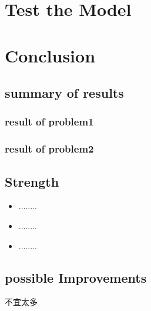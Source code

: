 \section{Test the Model}


\section{Conclusion}

\subsection{summary of results}

\subsubsection{result of problem1}

\subsubsection{result of problem2}


\subsection{Strength}
\begin{itemize}
	\item ........
	\item ........
	\item ........
\end{itemize}
\subsection{possible Improvements}
不宜太多




